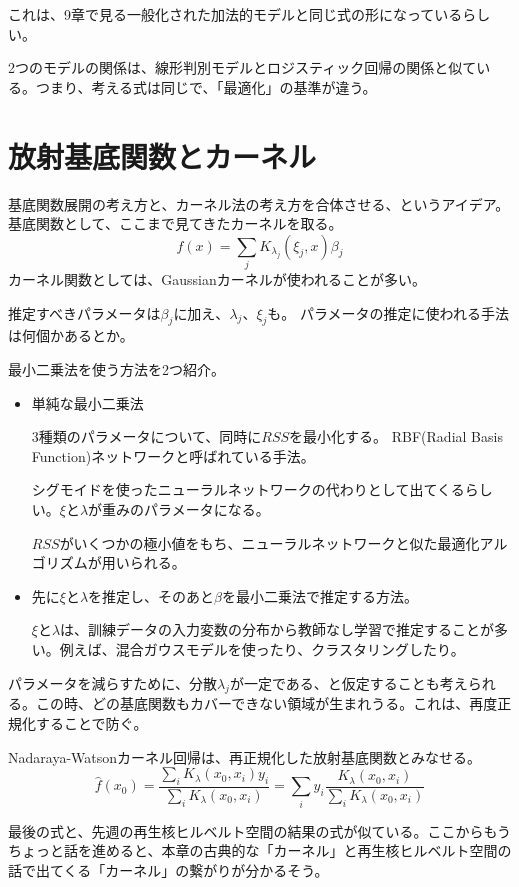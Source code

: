 \documentclass{jsarticle}
\begin{document}
これは、9章で見る一般化された加法的モデルと同じ式の形になっているらしい。

2つのモデルの関係は、線形判別モデルとロジスティック回帰の関係と似ている。つまり、考える式は同じで、「最適化」の基準が違う。

\section{放射基底関数とカーネル}
基底関数展開の考え方と、カーネル法の考え方を合体させる、というアイデア。基底関数として、ここまで見てきたカーネルを取る。
\[
  f(x)=\sum_{j}K_{\lambda_{j}}(\xi_{j},x)\beta_{j}
\]
カーネル関数としては、Gaussianカーネルが使われることが多い。

推定すべきパラメータは$\beta_{j}$に加え、$\lambda_{j}$、$\xi_{j}$も。
パラメータの推定に使われる手法は何個かあるとか。

最小二乗法を使う方法を2つ紹介。
\begin{itemize}
  \item 単純な最小二乗法

  3種類のパラメータについて、同時に$RSS$を最小化する。
  RBF(Radial Basis Function)ネットワークと呼ばれている手法。

  シグモイドを使ったニューラルネットワークの代わりとして出てくるらしい。$\xi$と$\lambda$が重みのパラメータになる。

  $RSS$がいくつかの極小値をもち、ニューラルネットワークと似た最適化アルゴリズムが用いられる。

  \item 先に$\xi$と$\lambda$を推定し、そのあと$\beta$を最小二乗法で推定する方法。

  $\xi$と$\lambda$は、訓練データの入力変数の分布から教師なし学習で推定することが多い。例えば、混合ガウスモデルを使ったり、クラスタリングしたり。
\end{itemize}

パラメータを減らすために、分散$\lambda_j$が一定である、と仮定することも考えられる。この時、どの基底関数もカバーできない領域が生まれうる。これは、再度正規化することで防ぐ。

Nadaraya-Watsonカーネル回帰は、再正規化した放射基底関数とみなせる。
\[
  \hat{f}(x_{0})=\frac{\sum_{i}K_{\lambda}(x_{0},x_{i})y_{i}}{\sum_{i}K_{\lambda}(x_{0},x_{i})}=\sum_{i}y_{i}\frac{K_{\lambda}(x_{0},x_{i})}{\sum_{i}K_{\lambda}(x_{0},x_{i})}
\]

最後の式と、先週の再生核ヒルベルト空間の結果の式が似ている。ここからもうちょっと話を進めると、本章の古典的な「カーネル」と再生核ヒルベルト空間の話で出てくる「カーネル」の繋がりが分かるそう。
\end{document}
